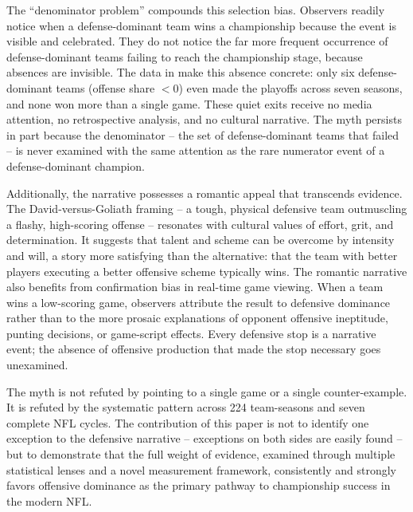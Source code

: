 The ``denominator problem'' compounds this selection bias. Observers readily
notice when a defense-dominant team wins a championship because the event is
visible and celebrated. They do not notice the far more frequent occurrence of
defense-dominant teams failing to reach the championship stage, because absences
are invisible. The data in  make this absence
concrete: only six defense-dominant teams (offense share $< 0$) even made the
playoffs across seven seasons, and none won more than a single game. These quiet
exits receive no media attention, no retrospective analysis, and no cultural
narrative. The myth persists in part because the denominator -- the set of
defense-dominant teams that failed -- is never examined with the same attention
as the rare numerator event of a defense-dominant champion.

Additionally, the narrative possesses a romantic appeal that transcends evidence.
The David-versus-Goliath framing -- a tough, physical defensive team outmuscling
a flashy, high-scoring offense -- resonates with cultural values of effort,
grit, and determination. It suggests that talent and scheme can be overcome by
intensity and will, a story more satisfying than the alternative: that the team
with better players executing a better offensive scheme typically wins. The
romantic narrative also benefits from confirmation bias in real-time game
viewing. When a team wins a low-scoring game, observers attribute the result to
defensive dominance rather than to the more prosaic explanations of opponent
offensive ineptitude, punting decisions, or game-script effects. Every defensive
stop is a narrative event; the absence of offensive production that made the stop
necessary goes unexamined.

The myth is not refuted by pointing to a single game or a single counter-example.
It is refuted by the systematic pattern across 224 team-seasons and seven
complete NFL cycles. The contribution of this paper is not to identify one
exception to the defensive narrative -- exceptions on both sides are easily
found -- but to demonstrate that the full weight of evidence, examined through
multiple statistical lenses and a novel measurement framework, consistently and
strongly favors offensive dominance as the primary pathway to championship
success in the modern NFL.
